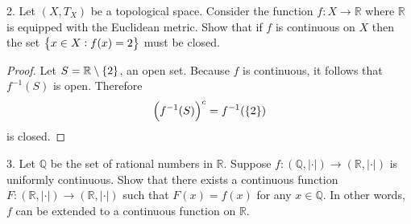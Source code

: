 \documentclass{article}
\newcommand{\Q}{\mathbb{Q}}
\newcommand{\R}{\mathbb{R}}
\begin{document}
\newpage

2. Let $(X, T_X)$ be a topological space. Consider the function $f: X
   \to \R$ where $\R$ is equipped with the Euclidean metric. Show that
   if $f$ is continuous on $X$ then the set $\cbr{x \in X : f(x) = 2}$
   must be closed.

\begin{proof}

Let $S = \R \setminus \cbr{2}$, an open set. Because $f$ is continuous,
it follows that $f^{-1}(S)$ is open. Therefore
%
\begin{equation*}
    \del{f^{-1}(S)}^c = f^{-1}(\cbr{2})
\end{equation*}
%
is closed.

\end{proof}

\newpage

3. Let $\Q$ be the set of rational numbers in $\R$. Suppose $f: (\Q,
   |\cdot|) \to (\R, |\cdot|)$ is uniformly continuous. Show that there
   exists a continuous function $F: (\R, |\cdot|) \to (\R, |\cdot|)$
   such that $F(x) = f(x)$ for any $x \in \mathbb{Q}$. In other words,
   $f$ can be extended to a continuous function on $\R$.
\end{document}
